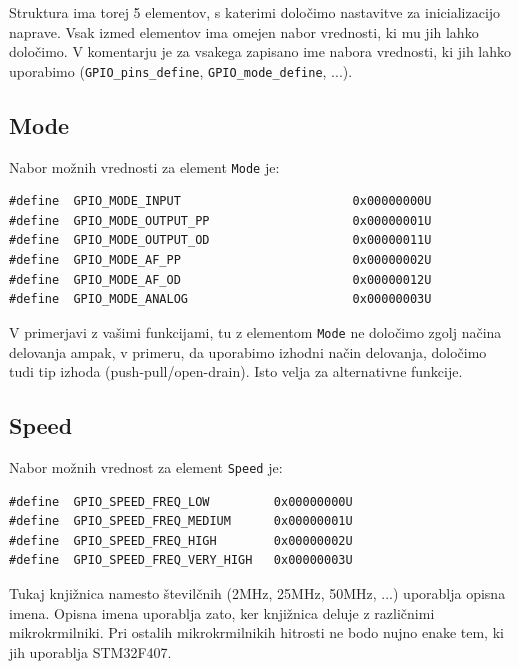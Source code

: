 \documentclass[12pt,letterpaper]{article}
\begin{document}
Struktura ima torej 5 elementov, s katerimi določimo nastavitve za inicializacijo naprave. Vsak izmed elementov ima omejen nabor vrednosti, ki mu jih lahko določimo. V komentarju je za vsakega zapisano ime nabora vrednosti, ki jih lahko uporabimo (\texttt{GPIO\_pins\_define}, \texttt{GPIO\_mode\_define}, ...).

\subsection*{Mode}

Nabor možnih vrednosti za element \texttt{Mode} je:

\begin{center}
\begin{lstlisting}[style=CStyle]
#define  GPIO_MODE_INPUT                        0x00000000U
#define  GPIO_MODE_OUTPUT_PP                    0x00000001U
#define  GPIO_MODE_OUTPUT_OD                    0x00000011U
#define  GPIO_MODE_AF_PP                        0x00000002U
#define  GPIO_MODE_AF_OD                        0x00000012U
#define  GPIO_MODE_ANALOG                       0x00000003U
\end{lstlisting}
\end{center}

V primerjavi z vašimi funkcijami, tu z elementom \texttt{Mode} ne določimo zgolj načina delovanja ampak, v primeru, da uporabimo izhodni način delovanja, določimo tudi tip izhoda (push-pull/open-drain). Isto velja za alternativne funkcije.

\subsection*{Speed}

Nabor možnih vrednost za element \texttt{Speed} je:

\begin{center}
\begin{lstlisting}[style=CStyle]
#define  GPIO_SPEED_FREQ_LOW         0x00000000U
#define  GPIO_SPEED_FREQ_MEDIUM      0x00000001U
#define  GPIO_SPEED_FREQ_HIGH        0x00000002U
#define  GPIO_SPEED_FREQ_VERY_HIGH   0x00000003U
\end{lstlisting}
\end{center}

Tukaj knjižnica namesto številčnih  (2MHz, 25MHz, 50MHz, ...) uporablja opisna imena. Opisna imena uporablja zato, ker knjižnica deluje z različnimi mikrokrmilniki. Pri ostalih mikrokrmilnikih hitrosti ne bodo nujno enake tem, ki jih uporablja STM32F407.
\end{document}
